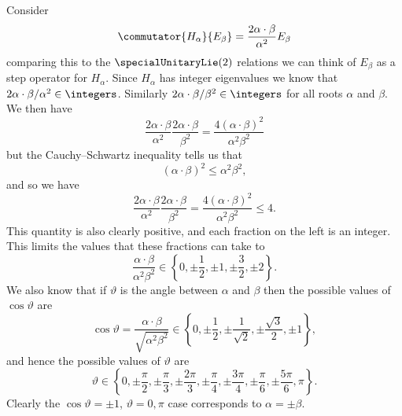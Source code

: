\documentclass[fleqn]{NotesClass}
\begin{document}
    Consider
    \begin{equation}
        \commutator{H_\alpha}{E_\beta} = \frac{2\alpha \cdot \beta}{\alpha^2} E_\beta
    \end{equation}
    comparing this to the \(\specialUnitaryLie(2)\) relations we can think of \(E_\beta\) as a step operator for \(H_\alpha\).
    Since \(H_\alpha\) has integer eigenvalues we know that \(2\alpha \cdot \beta/\alpha^2 \in \integers\).
    Similarly \(2\alpha \cdot \beta/\beta^2 \in \integers\) for all roots \(\alpha\) and \(\beta\).
    We then have
    \begin{equation}
        \frac{2\alpha \cdot \beta}{\alpha^2} \frac{2\alpha \cdot \beta}{\beta^2} = \frac{4(\alpha \cdot \beta)^2}{\alpha^2 \beta^2}
    \end{equation}
    but the Cauchy--Schwartz inequality tells us that
    \begin{equation}
        (\alpha \cdot \beta)^2 \le \alpha^2 \beta^2,
    \end{equation}
    and so we have
    \begin{equation}
        \frac{2\alpha \cdot \beta}{\alpha^2} \frac{2\alpha \cdot \beta}{\beta^2} = \frac{4(\alpha \cdot \beta)^2}{\alpha^2 \beta^2} \le 4.
    \end{equation}
    This quantity is also clearly positive, and each fraction on the left is an integer.
    This limits the values that these fractions can take to
    \begin{equation}
        \frac{\alpha \cdot \beta}{\alpha^2 \beta^2} \in \left\{ 0, \pm \frac{1}{2}, \pm 1, \pm \frac{3}{2}, \pm 2 \right\}.
    \end{equation}
    We also know that if \(\vartheta\) is the angle between \(\alpha\) and \(\beta\) then the possible values of \(\cos\vartheta\) are
    \begin{equation}
        \cos\vartheta = \frac{\alpha \cdot \beta}{\sqrt{\alpha^2 \beta^2}} \in \left\{ 0, \pm\frac{1}{2}, \pm\frac{1}{\sqrt{2}}, \pm\frac{\sqrt{3}}{2}, \pm 1 \right\},
    \end{equation}
    and hence the possible values of \(\vartheta\) are
    \begin{equation}
        \vartheta \in \left\{ 0, \pm \frac{\pi}{2}, \pm \frac{\pi}{3}, \pm\frac{2\pi}{3}, \pm\frac{\pi}{4}, \pm\frac{3\pi}{4}, \pm\frac{\pi}{6}, \pm\frac{5\pi}{6}, \pi \right\}.
    \end{equation}
    Clearly the \(\cos\vartheta = \pm 1\), \(\vartheta = 0, \pi\) case corresponds to \(\alpha = \pm \beta\).
    
\end{document}

